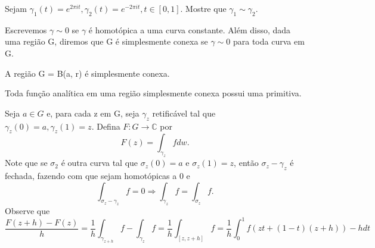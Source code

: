 \documentclass[ComplexAnalysis/complex.tex]{subfiles}
\begin{document}
\begin{exer*}
	Sejam $\gamma_{1}(t) = e^{2\pi it}, \gamma_{2}(t) = e^{-2\pi it}, t\in[0, 1]$. Mostre que $\gamma_{1}\sim \gamma_{2}.$
\end{exer*}
Escrevemos $\gamma\sim0$ se $\gamma$ é homotópica a uma curva constante. Além disso, dada uma região G, diremos que
G é simplesmente conexa se $\gamma\sim0$ para toda curva em G.
\begin{exer*}
	A região G = B(a, r) é simplesmente conexa.
\end{exer*}
\begin{theorem*}
	Toda função analítica em uma região simplesmente conexa possui uma primitiva.
\end{theorem*}
\begin{proof*}
	Seja $a\in{G}$ e, para cada z em G, seja $\gamma_{z}$ retificável tal que $\gamma_{z}(0) = a, \gamma_{z}(1) = z.$ Defina
	$F:G\rightarrow \mathbb{C}$ por
	$$
		F(z) = \int_{\gamma_{z}}^{}fdw.
	$$
	Note que se $\sigma_{2}$ é outra curva tal que $\sigma_{z}(0) = a$ e $\sigma_{z}(1) = z$, então $\sigma_{z} - \gamma_{z}$
	é fechada, fazendo com que sejam homotópicas a 0 e
	$$
		\int_{\sigma_{z}-\gamma_{z}}^{}f = 0\Rightarrow \int_{\gamma_{z}}^{}f = \int_{\sigma_{z}}^{}f.
	$$
	Observe que
	$$
		\frac{F(z+h) - F(z)}{h} = \frac{1}{h}\int_{\gamma_{z+h}}^{}f - \int_{\gamma_{z}}^{}f = \frac{1}{h}\int_{[z, z+h]}^{}f = \frac{1}{h}\int_{0}^{1}f(zt + (1-t)(z+h))-hdt
	$$
\end{proof*}
\end{document}
